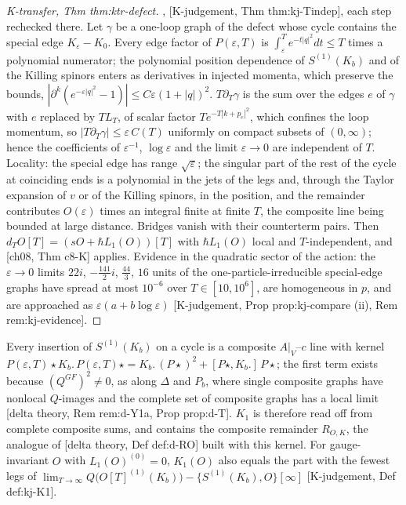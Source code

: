 \begin{proof}
[K-transfer, Thm thm:ktr-defect], [K-judgement, Thm thm:kj-Tindep], each step rechecked there. Let $\gamma$ be a one-loop graph of the defect whose cycle contains the special edge $K_\varepsilon-K_0$. Every edge factor of $P(\varepsilon,T)$ is $\int_\varepsilon^Te^{-t|q|^2}dt\le T$ times a polynomial numerator; the polynomial position dependence of $S^{(1)}(K_b)$ and of the Killing spinors enters as derivatives in injected momenta, which preserve the bounds, $|\partial^k(e^{-\varepsilon|q|^2}-1)|\le C\varepsilon(1+|q|)^2$. $T\partial_T\gamma$ is the sum over the edges $e$ of $\gamma$ with $e$ replaced by $TL_T$, of scalar factor $Te^{-T|k+p_e|^2}$, which confines the loop momentum, so $|T\partial_T\gamma|\le\varepsilon\,C(T)$ uniformly on compact subsets of $(0,\infty)$; hence the coefficients of $\varepsilon^{-1}$, $\log\varepsilon$ and the limit $\varepsilon\to0$ are independent of $T$. Locality: the special edge has range $\sqrt\varepsilon$; the singular part of the rest of the cycle at coinciding ends is a polynomial in the jets of the legs and, through the Taylor expansion of $v$ or of the Killing spinors, in the position, and the remainder contributes $O(\varepsilon)$ times an integral finite at finite $T$, the composite line being bounded at large distance. Bridges vanish with their counterterm pairs. Then $d_TO[T]=(sO+\hbar L_1(O))[T]$ with $\hbar L_1(O)$ local and $T$-independent, and [ch08, Thm c8-K] applies. Evidence in the quadratic sector of the action: the $\varepsilon\to0$ limits $22i$, $-\tfrac{141}2i$, $\tfrac{44}3$, $16$ units of the one-particle-irreducible special-edge graphs have spread at most $10^{-6}$ over $T\in[10,10^6]$, are homogeneous in $p$, and are approached as $\varepsilon(a+b\log\varepsilon)$ [K-judgement, Prop prop:kj-compare (ii), Rem rem:kj-evidence].
\end{proof}

\begin{remark}
\label{rem:o-Kcomposite}
Every insertion of $S^{(1)}(K_b)$ on a cycle is a composite $A|_V$--$c$ line with kernel $P(\varepsilon,T)\star K_b.\,P(\varepsilon,T)\star=K_b.\,(P\star)^2+[P\star,K_b.]\,P\star$; the first term exists because $(Q^{GF})^2\neq0$, as along $\Delta$ and $P_b$, where single composite graphs have nonlocal $Q$-images and the complete set of composite graphs has a local limit [delta theory, Rem rem:d-Y1a, Prop prop:d-T]. $K_1$ is therefore read off from complete composite sums, and contains the composite remainder $R_{O,K}$, the analogue of [delta theory, Def def:d-RO] built with this kernel. For gauge-invariant $O$ with $L_1(O)^{(0)}=0$, $K_1(O)$ also equals the part with the fewest legs of $\lim_{T\to\infty}Q\big(O[T]^{(1)}(K_b)\big)-\{S^{(1)}(K_b),O\}[\infty]$ [K-judgement, Def def:kj-K1].
\end{remark}


